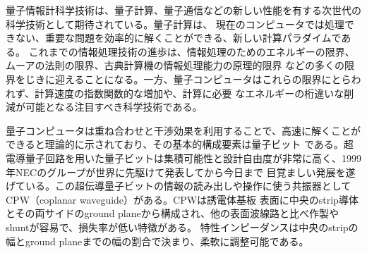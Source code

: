 量子情報計科学技術は、量子計算、量子通信などの新しい性能を有する次世代の科学技術として期待されている。量子計算は、
現在のコンピュータでは処理できない、重要な問題を効率的に解くことができる、新しい計算パラダイムである。
これまでの情報処理技術の進歩は、情報処理のためのエネルギーの限界、ムーアの法則の限界、古典計算機の情報処理能力の原理的限界
などの多くの限界をじきに迎えることになる。一方、量子コンピュータはこれらの限界にとらわれず、計算速度の指数関数的な増加や、計算に必要
なエネルギーの桁違いな削減が可能となる注目すべき科学技術である。

量子コンピュータは重ね合わせと干渉効果を利用することで、高速に解くことができると理論的に示されており、その基本的構成要素は量子ビット
である。超電導量子回路を用いた量子ビットは集積可能性と設計自由度が非常に高く、1999年NECのグループが世界に先駆けて発表してから今日まで
目覚ましい発展を遂げている。この超伝導量子ビットの情報の読み出しや操作に使う共振器としてCPW（coplanar waveguide）がある。CPWは誘電体基板
表面に中央のstrip導体とその両サイドのground planeから構成され、他の表面波線路と比べ作製やshuntが容易で、損失率が低い特徴がある。
特性インピーダンスは中央のstripの幅とground planeまでの幅の割合で決まり、柔軟に調整可能である。